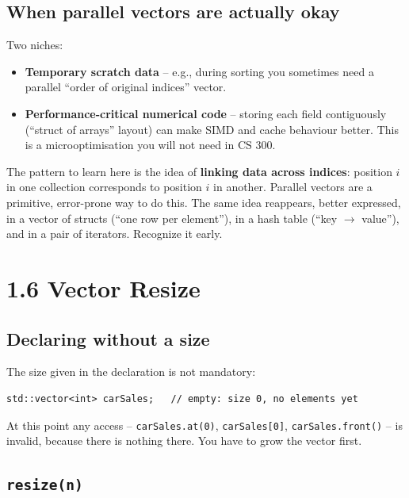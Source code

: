 \documentclass[11pt]{article}
\begin{document}
\subsection{When parallel vectors are actually okay}

Two niches:
\begin{itemize}
    \item \textbf{Temporary scratch data} -- e.g., during sorting you
          sometimes need a parallel ``order of original indices''
          vector.
    \item \textbf{Performance-critical numerical code} -- storing each
          field contiguously (``struct of arrays'' layout) can make
          SIMD and cache behaviour better. This is a microoptimisation
          you will not need in CS 300.
\end{itemize}

\begin{ideabox}
The pattern to learn here is the idea of \textbf{linking data across
indices}: position $i$ in one collection corresponds to position $i$
in another. Parallel vectors are a primitive, error-prone way to do
this. The same idea reappears, better expressed, in a vector of
structs (``one row per element''), in a hash table (``key $\to$
value''), and in a pair of iterators. Recognize it early.
\end{ideabox}

\section{1.6 Vector Resize}

\subsection{Declaring without a size}

The size given in the declaration is not mandatory:
\begin{lstlisting}
std::vector<int> carSales;   // empty: size 0, no elements yet
\end{lstlisting}
At this point any access -- \texttt{carSales.at(0)},
\texttt{carSales[0]}, \texttt{carSales.front()} -- is invalid, because
there is nothing there. You have to grow the vector first.

\subsection{\texttt{resize(n)}}
\end{document}
